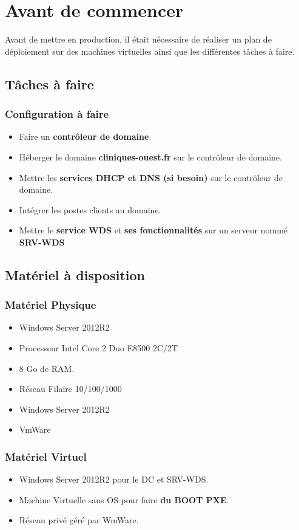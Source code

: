 \documentclass[11pt,a4paper,oneside]{article}
\begin{document}
\section{Avant de commencer}
Avant de mettre en production, il était nécessaire de réaliser un plan de déploiement sur des machines virtuelles ainsi que les différentes tâches à faire.

\subsection{Tâches à faire}
\subsubsection{Configuration à faire}
\begin{itemize}
\item Faire un \textbf{contrôleur de domaine}.
\item Héberger le domaine \textbf{cliniques-ouest.fr} sur le contrôleur de domaine.
\item Mettre les \textbf{services DHCP et DNS (si besoin)} sur le contrôleur de domaine.
\item Intégrer les postes clients au domaine.
\item Mettre le \textbf{service WDS} et \textbf{ses fonctionnalités} sur un serveur nommé \textbf{SRV-WDS}
\end{itemize}

\subsection{Matériel à disposition}
\subsubsection{Matériel Physique}
\begin{itemize}
\item Windows Server 2012R2
\item Processeur Intel Core 2 Duo E8500 2C/2T
\item 8 Go de RAM.
\item Réseau Filaire 10/100/1000
\item Windows Server 2012R2
\item VmWare
\end{itemize}

\subsubsection{Matériel Virtuel}
\begin{itemize}
\item Windows Server 2012R2 pour le DC et SRV-WDS.
\item Machine Virtuelle sans OS pour faire \textbf{du BOOT PXE}.
\item Réseau privé géré par WmWare.
\end{itemize}
\newpage
\end{document}
